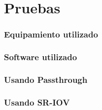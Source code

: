 \chapter{Pruebas\label{sec:desarrollo}}


\subsection{Equipamiento utilizado\label{sec:equipamiento}}

\subsection{Software utilizado\label{sec:sw}}



\subsection{Usando Passthrough\label{sec:pt}}

\subsection{Usando SR-IOV\label{sec:sriov}}